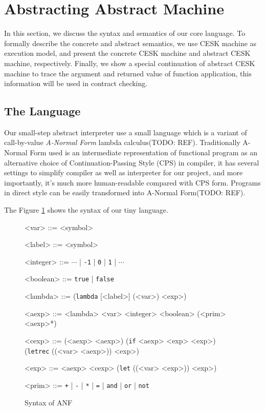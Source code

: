 \documentclass[paper=a4, fontsize=11pt]{scrartcl} %
\numberwithin{equation}{section} %
\numberwithin{figure}{section} %
\numberwithin{table}{section} %
\begin{document}

\section{Abstracting Abstract Machine}

In this section, we discuss the syntax and semantics of our core language. To formally describe the concrete and abstract semantics, we use CESK machine as execution model, and present the concrete CESK machine and abstract CESK machine, respectively. Finally, we show a special continuation of abstract CESK machine to trace the argument and returned value of function application, this information will be used in contract checking.


\subsection{The Language}

Our small-step abstract interpreter use a small language which is a variant of call-by-value \textit{A-Normal Form} lambda calculus(TODO: REF). Traditionally A-Normal Form used is an intermediate representation of functional program as an alternative choice of Continuation-Passing Style (CPS) in compiler, it has several settings to simplify compiler as well as interpreter for our project, and more importantly, it's much more human-readable compared with CPS form. Programs in direct style can be easily transformed into A-Normal Form(TODO: REF).

The Figure \ref{fig:anf} shows the syntax of our tiny language.

\begin{figure}[h!]
\setlength{\grammarparsep}{7pt plus 1pt minus 1pt} %
\setlength{\grammarindent}{8em} %
\begin{grammar}
<var> ::= <symbol>

<label> ::= <symbol>

<integer> ::= $\cdots$ | \texttt{-1} | \texttt{0} | \texttt{1} | $\cdots$

<boolean> ::= \texttt{true} | \texttt{false}

<lambda> ::= (\texttt{lambda} [<label>] (<var>) <exp>)

<aexp> ::= <lambda>
\alt <var>
\alt <integer>
\alt <boolean>
\alt (<prim> <aexp>*)

<cexp> ::= (<aexp> <aexp>)
\alt (\texttt{if} <aexp> <exp> <exp>)
\alt (\texttt{letrec} ((<var> <aexp>)) <exp>)

<exp> ::= <aexp>
\alt <cexp>
\alt (\texttt{let} ((<var> <exp>)) <exp>)

<prim> ::= \texttt{+} | \texttt{-} | \texttt{*} | \texttt{=} | \texttt{and} | \texttt{or} | \texttt{not}
\end{grammar}
\caption{Syntax of ANF}
\label{fig:anf}
\end{figure}
\end{document}
